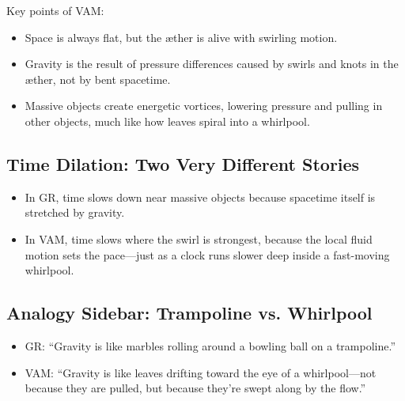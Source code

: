 Key points of VAM:


\begin{itemize}

\item
Space is always flat, but the æther is alive with swirling motion.




\item
Gravity is the result of pressure differences caused by swirls and knots in the æther, not by bent spacetime.




\item
Massive objects create energetic vortices, lowering pressure and pulling in other objects, much like how leaves spiral into a whirlpool.




\end{itemize}

\subsection*{Time Dilation: Two Very Different Stories}

\begin{itemize}

\item
In GR, time slows down near massive objects because spacetime itself is stretched by gravity.




\item
In VAM, time slows where the swirl is strongest, because the local fluid motion sets the pace—just as a clock runs slower deep inside a fast-moving whirlpool.




\end{itemize}

\subsection*{Analogy Sidebar: Trampoline vs. Whirlpool}

\begin{itemize}

\item
GR: “Gravity is like marbles rolling around a bowling ball on a trampoline.”




\item
VAM: “Gravity is like leaves drifting toward the eye of a whirlpool—not because they are pulled, but because they’re swept along by the flow.”




\end{itemize}

